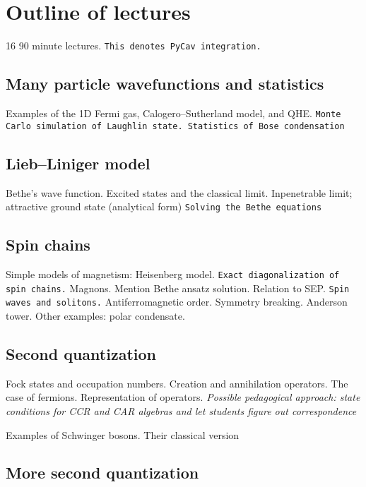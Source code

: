 \section{Outline of lectures}

16 90 minute lectures. \verb|This denotes PyCav integration.|

\subsection{Many particle wavefunctions and statistics}

Examples of the 1D Fermi gas, Calogero--Sutherland model, and QHE. \verb|Monte Carlo simulation of Laughlin state. Statistics of Bose condensation|

\subsection{Lieb--Liniger model}

Bethe's wave function. Excited states and the classical limit. Inpenetrable limit; attractive ground state (analytical form) \verb|Solving the Bethe equations|

\subsection{Spin chains}

Simple models of magnetism: Heisenberg model. \verb|Exact diagonalization of spin chains.| Magnons. Mention Bethe ansatz solution. Relation to SEP. \verb|Spin waves and solitons.|
Antiferromagnetic order. Symmetry breaking. Anderson tower. Other examples: polar condensate.

\subsection{Second quantization}

Fock states and occupation numbers. Creation and annihilation operators. The case of fermions. Representation of operators. \textit{Possible pedagogical approach: state conditions for CCR and CAR algebras and let students figure out correspondence}

Examples of Schwinger bosons. Their classical version

\subsection{More second quantization}

